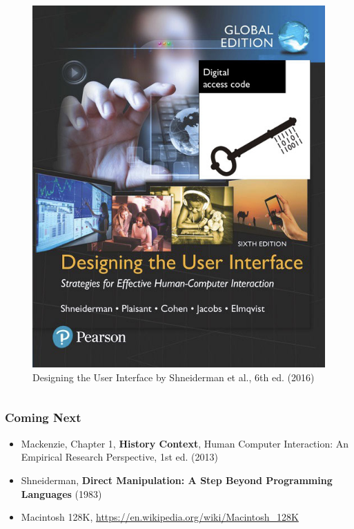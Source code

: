 \documentclass{beamer}
\begin{document}
\begin{frame}
\begin{columns}[t]
		\begin{figure}
			\includegraphics[width=1\linewidth]{shneiderman}
			\caption{Designing the User Interface by Shneiderman et al., 6th ed. (2016)}
		\end{figure}
	
		
	\end{columns}
	
\end{frame}

\begin{frame}
	\frametitle{Coming Next}
	\begin{itemize}
		\item Mackenzie, Chapter 1, \textbf{History Context}, Human Computer Interaction: An Empirical Research Perspective, 1st ed. (2013) 
		\item Shneiderman, \textbf{Direct Manipulation: A Step Beyond Programming Languages} (1983)
		\item Macintosh 128K, \url{https://en.wikipedia.org/wiki/Macintosh_128K}
	\end{itemize}
\end{frame}
\end{document}
